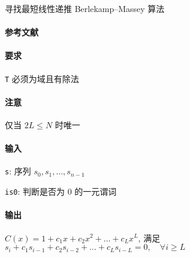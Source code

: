 寻找最短线性递推 Berlekamp–Massey 算法

\paragraph{参考文献} \cite{massey1969shift}

\paragraph{要求} \verb|T| 必须为域且有除法

\paragraph{注意} 仅当 \(2L \leq N\) 时唯一

\paragraph{输入}

\verb|s|: 序列 \(s_0, s_1, \dots, s_{n-1}\)

\verb|is0|: 判断是否为 \(0\) 的一元谓词

\paragraph{输出}

\(C(x)=1+c_{1}x+c_{2}x^{2}+\dots+c_{L}x^{L}\), 满足 \(s_{i} + c_{1}s_{i-1} + c_{2}s_{i-2} + \dots + c_{L}s_{i-L} = 0,\quad\forall i\geq L\)
